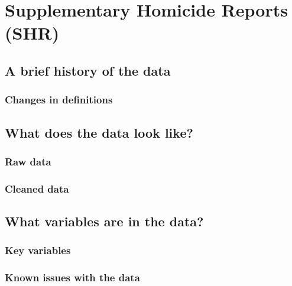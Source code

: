 \documentclass[
  12pt,
  openany]{book}
\begin{document}
\hypertarget{shr}{%
\chapter{Supplementary Homicide Reports (SHR)}\label{shr}}

\hypertarget{a-brief-history-of-the-data-2}{%
\section{A brief history of the data}\label{a-brief-history-of-the-data-2}}

\hypertarget{changes-in-definitions-2}{%
\subsection{Changes in definitions}\label{changes-in-definitions-2}}

\hypertarget{what-does-the-data-look-like-2}{%
\section{What does the data look like?}\label{what-does-the-data-look-like-2}}

\hypertarget{raw-data-2}{%
\subsection{Raw data}\label{raw-data-2}}

\hypertarget{cleaned-data-2}{%
\subsection{Cleaned data}\label{cleaned-data-2}}

\hypertarget{what-variables-are-in-the-data-2}{%
\section{What variables are in the data?}\label{what-variables-are-in-the-data-2}}

\hypertarget{key-variables-2}{%
\subsection{Key variables}\label{key-variables-2}}

\hypertarget{known-issues-with-the-data-2}{%
\subsection{Known issues with the data}\label{known-issues-with-the-data-2}}
\end{document}
